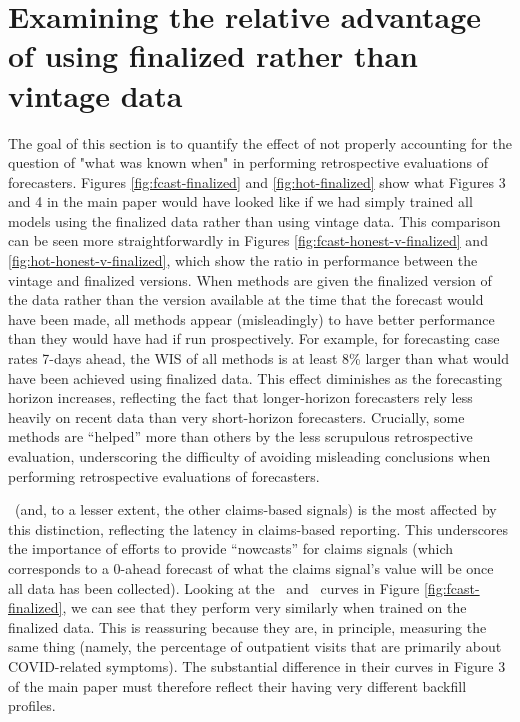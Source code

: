

\section{Examining the relative advantage of using finalized rather than vintage data}

The goal of this section is to quantify the effect of
not properly accounting for the question of "what was known when" in
performing retrospective evaluations of forecasters.   Figures
\ref{fig:fcast-finalized} and \ref{fig:hot-finalized} show 
what Figures 3 and 4 in the main paper would have looked like if we
had simply trained all models using the finalized data rather than
using vintage data.  This comparison can be seen more
straightforwardly in Figures \ref{fig:fcast-honest-v-finalized} and
\ref{fig:hot-honest-v-finalized}, which show the ratio in performance between
the vintage and finalized 
versions.  When methods are 
given the finalized version of the data rather than the version available at the
time that the forecast would have been made, all methods 
appear (misleadingly) to have better performance than they would
have had if run prospectively.  For example, for forecasting case rates
7-days ahead, the WIS of all methods is at least 8\% larger than what would have been
achieved using finalized data.  This effect
diminishes as the forecasting horizon increases, reflecting the fact
that longer-horizon forecasters rely less heavily on recent data than very
short-horizon forecasters.  Crucially, some methods are
``helped'' more than others by the less scrupulous retrospective
evaluation, underscoring the difficulty of avoiding misleading
conclusions when performing retrospective evaluations of forecasters.

\chngcli~(and, to a lesser extent, the other claims-based
signals) is the most  
affected by this distinction, reflecting the latency in claims-based
reporting.  This underscores the importance of efforts to provide ``nowcasts'' for
claims signals 
(which corresponds to a 0-ahead forecast of what the claims
signal's value will be once all data has been collected). Looking at
the \chngcli~and \dv~curves in Figure \ref{fig:fcast-finalized}, we
can see that they perform very similarly when trained on the finalized data.
This is reassuring 
because they are, in principle, measuring the same thing (namely, the percentage of
outpatient visits that are primarily about COVID-related symptoms).
The substantial difference in their curves in Figure 3 of the
main paper must therefore reflect their having very different
backfill profiles.  
  
